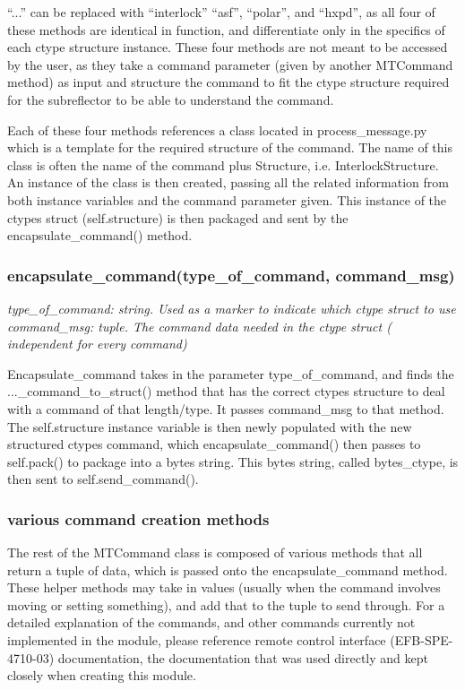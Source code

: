 \documentclass{article}
\begin{document}
``...'' can be replaced with ``interlock'' ``asf'', ``polar'', and ``hxpd'', as all four of these methods are identical in function, and differentiate only in the specifics of each ctype structure instance. These four methods are not meant to be accessed by the user, as they take a command parameter (given by another MTCommand method) as input and structure the command to fit the ctype structure required for the subreflector to be able to understand the command.
\vspace{10pt}

Each of these four methods references a class located in process\_message.py which is a template for the required structure of the command. The name of this class is often the name of the command plus Structure, i.e. InterlockStructure. An instance of the class is then created, passing all the related information from both instance variables and the command parameter given. This instance of the ctypes struct (self.structure) is then packaged and sent by the encapsulate\_command() method.


\subsubsection*{encapsulate\_command(type\_of\_command, command\_msg)}
\emph{type\_of\_command: string. Used as a marker to indicate which ctype struct to use}\\
\emph{command\_msg: tuple. The command data needed in the ctype struct ( independent for every command)}
\vspace{10pt}

Encapsulate\_command takes in the parameter type\_of\_command, and finds the ...\_command\_to\_struct() method that has the correct ctypes structure to deal with a command of that length/type. It passes command\_msg to that method. The self.structure instance variable is then newly populated with the new structured ctypes command, which encapsulate\_command() then passes to self.pack() to package into a bytes string. This bytes string, called bytes\_ctype, is then sent to self.send\_command(). 


\subsubsection*{various command creation methods}

The rest of the MTCommand class is composed of various methods that all return a tuple of data, which is passed onto the encapsulate\_command method. These helper methods may take in values (usually when the command involves moving or setting something), and add that to the tuple to send through. For a detailed explanation of the commands, and other commands currently not implemented in the module, please reference remote control interface (EFB-SPE-4710-03)  documentation, the documentation that was used directly and kept closely when creating this module. 
 
\end{document}

